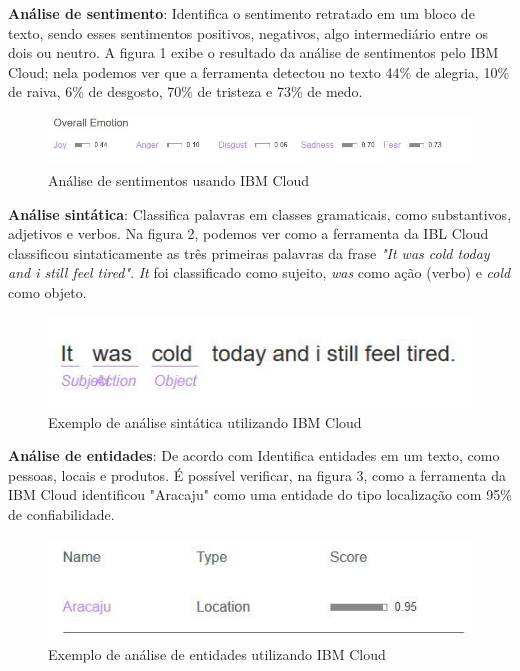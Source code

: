 \documentclass{article}
\begin{document}
\textbf{Análise de sentimento}: Identifica o sentimento retratado em um bloco de texto, sendo esses sentimentos positivos, negativos, algo intermediário entre os dois ou neutro. A figura 1 exibe o resultado da análise de sentimentos pelo IBM Cloud; nela podemos ver que a ferramenta detectou no texto 44\% de alegria, 10\% de raiva, 6\% de desgosto, 70\% de tristeza e 73\% de medo. \\
\begin{figure}[H]
    \centering
    \includegraphics[scale=0.5]{imagens/nlp_sentimentos.jpg}
    \caption{Análise de sentimentos usando IBM Cloud}
    \label{fig:my_label}
\end{figure}{}
\textbf{Análise sintática}: Classifica palavras em classes gramaticais, como substantivos, adjetivos e verbos. Na figura 2, podemos ver como a ferramenta da IBL Cloud classificou sintaticamente as três primeiras palavras da frase \textit{"It was cold today and i still feel tired"}. \textit{It} foi classificado como sujeito, \textit{was} como ação (verbo) e \textit{cold} como objeto. \\
\begin{figure}[H]
    \centering
    \includegraphics[scale=0.5]{imagens/nlp_analise_sintatica.jpg}
    \caption{Exemplo de análise sintática utilizando IBM Cloud}
    \label{fig:sintatica}
\end{figure}{}
\textbf{Análise de entidades}: De acordo com Identifica entidades em um texto, como pessoas, locais e produtos. É possível verificar, na figura 3, como a ferramenta da IBM Cloud identificou "Aracaju" como uma entidade do tipo localização com 95\% de confiabilidade. \\
\begin{figure}[H]
    \centering
    \includegraphics[scale=0.5]{imagens/nlp_entidade.jpg}
    \caption{Exemplo de análise de entidades utilizando IBM Cloud}
    \label{fig:nlp_entidades}
\end{figure}{}
\end{document}
